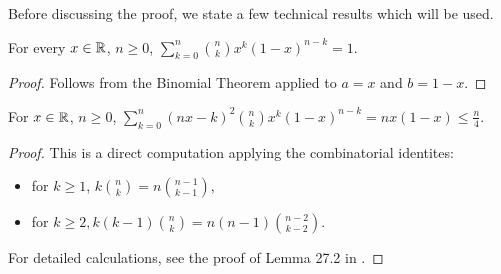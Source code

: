Before discussing the proof, we state a few technical results which will be used.
\begin{lemma}
    \label{lemma:anal:bernstein:1}
    For every $x \in {\mathbb R}$, $n \geq 0$, $\sum_{k = 0}^n  \binom{n}{k} x^k (1 - x)^{n - k} = 1$.
\end{lemma}
\begin{proof}
Follows from the Binomial Theorem applied to $a = x$ and $b = 1 - x$.
\end{proof}

\begin{lemma}
\label{lemma:anal:bernstein:2}
For $x \in {\mathbb R}$, $n \geq 0$, $\sum_{k = 0}^n (nx - k)^2 \binom{n}{k} x^k (1 - x)^{n - k} = nx(1-x) \leq \frac{n}{4}$.
\end{lemma}
\begin{proof}
This is a direct computation applying the combinatorial identites:
\begin{itemize}[noitemsep]
    \item for $k \geq 1$, $k \binom{n}{k} = n \binom{n - 1}{k - 1}$,
    \item for $k \geq 2, k (k - 1) \binom{n}{k} = n (n - 1)\binom{n - 2}{k - 2}$.
\end{itemize}
For detailed calculations, see the proof of Lemma 27.2 in \cite{ross_2015_elementary}.
\end{proof}

